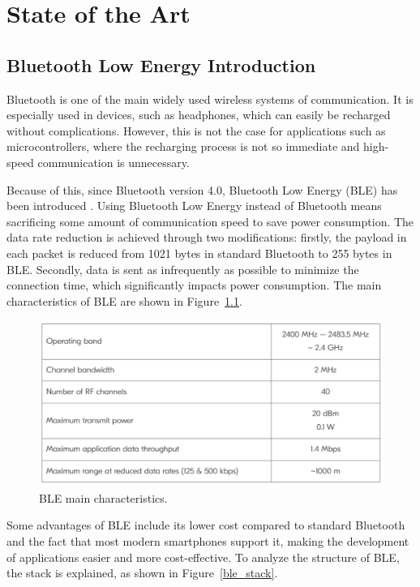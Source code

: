 \documentclass{Configuration_Files/PoliMi3i_thesis}
\begin{document}
\chapter{State of the Art}

\section{Bluetooth Low Energy Introduction}

Bluetooth is one of the main widely used wireless systems of communication. It is especially used in devices, such as headphones, which can easily be recharged without complications. However, this is not the case for applications such as microcontrollers, where the recharging process is not so immediate and high-speed communication is unnecessary. 

Because of this, since Bluetooth version 4.0, Bluetooth Low Energy (BLE) has been introduced \cite{nordic1}. Using Bluetooth Low Energy instead of Bluetooth means sacrificing some amount of communication speed to save power consumption. The data rate reduction is achieved through two modifications: firstly, the payload in each packet is reduced from 1021 bytes in standard Bluetooth to 255 bytes in BLE. Secondly, data is sent as infrequently as possible to minimize the connection time, which significantly impacts power consumption. The main characteristics of BLE are shown in Figure~\ref{ble_char}.

\begin{figure}[h]
    \centering
    \includegraphics[width=\linewidth]{Bluetooth Low Energy/Screenshot 2024-08-15 at 23.25.43.png}
    \caption{BLE main characteristics.}
    \label{ble_char}
\end{figure}

Some advantages of BLE include its lower cost compared to standard Bluetooth and the fact that most modern smartphones support it, making the development of applications easier and more cost-effective. To analyze the structure of BLE, the stack is explained, as shown in Figure~\ref{ble_stack}.
\end{document}
